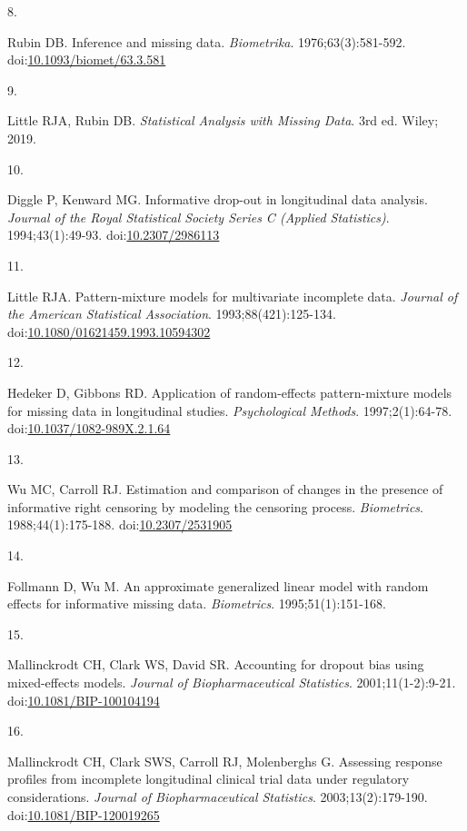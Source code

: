 \documentclass[
  11pt,
]{article}
\newlength{\cslhangindent}
\newlength{\csllabelwidth}
\newenvironment{CSLReferences}[2] %
 {\begin{list}{}{%
  \setlength{\itemindent}{0pt}
  \setlength{\leftmargin}{0pt}
  \setlength{\parsep}{0pt}
  \ifodd #1
   \setlength{\leftmargin}{\cslhangindent}
   \setlength{\itemindent}{-1\cslhangindent}
  \fi
  \setlength{\itemsep}{#2\baselineskip}}}
 {\end{list}}
\newcommand{\CSLLeftMargin}[1]{\parbox[t]{\csllabelwidth}{\strut#1\strut}}
\newcommand{\CSLRightInline}[1]{\parbox[t]{\linewidth - \csllabelwidth}{\strut#1\strut}}
\begin{document}
\begin{CSLReferences}{0}{1}
\CSLLeftMargin{8. }%
\CSLRightInline{Rubin DB. Inference and missing data. \emph{Biometrika}. 1976;63(3):581-592. doi:\href{https://doi.org/10.1093/biomet/63.3.581}{10.1093/biomet/63.3.581}}

\CSLLeftMargin{9. }%
\CSLRightInline{Little RJA, Rubin DB. \emph{Statistical Analysis with Missing Data}. 3rd ed. Wiley; 2019.}

\CSLLeftMargin{10. }%
\CSLRightInline{Diggle P, Kenward MG. Informative drop-out in longitudinal data analysis. \emph{Journal of the Royal Statistical Society Series C (Applied Statistics)}. 1994;43(1):49-93. doi:\href{https://doi.org/10.2307/2986113}{10.2307/2986113}}

\CSLLeftMargin{11. }%
\CSLRightInline{Little RJA. Pattern-mixture models for multivariate incomplete data. \emph{Journal of the American Statistical Association}. 1993;88(421):125-134. doi:\href{https://doi.org/10.1080/01621459.1993.10594302}{10.1080/01621459.1993.10594302}}

\CSLLeftMargin{12. }%
\CSLRightInline{Hedeker D, Gibbons RD. Application of random-effects pattern-mixture models for missing data in longitudinal studies. \emph{Psychological Methods}. 1997;2(1):64-78. doi:\href{https://doi.org/10.1037/1082-989X.2.1.64}{10.1037/1082-989X.2.1.64}}

\CSLLeftMargin{13. }%
\CSLRightInline{Wu MC, Carroll RJ. Estimation and comparison of changes in the presence of informative right censoring by modeling the censoring process. \emph{Biometrics}. 1988;44(1):175-188. doi:\href{https://doi.org/10.2307/2531905}{10.2307/2531905}}

\CSLLeftMargin{14. }%
\CSLRightInline{Follmann D, Wu M. An approximate generalized linear model with random effects for informative missing data. \emph{Biometrics}. 1995;51(1):151-168.}

\CSLLeftMargin{15. }%
\CSLRightInline{Mallinckrodt CH, Clark WS, David SR. Accounting for dropout bias using mixed-effects models. \emph{Journal of Biopharmaceutical Statistics}. 2001;11(1-2):9-21. doi:\href{https://doi.org/10.1081/BIP-100104194}{10.1081/BIP-100104194}}

\CSLLeftMargin{16. }%
\CSLRightInline{Mallinckrodt CH, Clark SWS, Carroll RJ, Molenberghs G. Assessing response profiles from incomplete longitudinal clinical trial data under regulatory considerations. \emph{Journal of Biopharmaceutical Statistics}. 2003;13(2):179-190. doi:\href{https://doi.org/10.1081/BIP-120019265}{10.1081/BIP-120019265}}


\end{CSLReferences}
\end{document}
